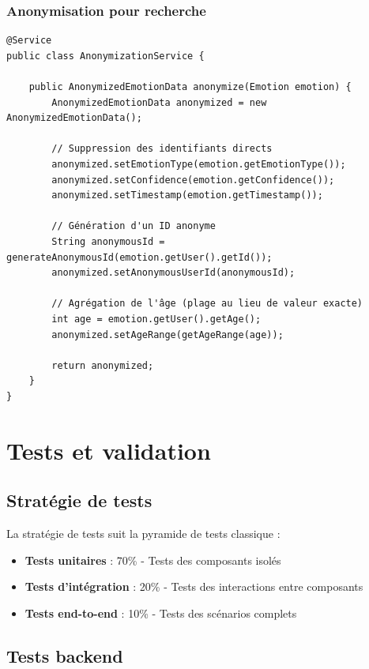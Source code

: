 \documentclass[a4paper,11pt]{report}
\begin{document}
\subsection{Anonymisation pour recherche}

\begin{lstlisting}[style=java, caption=Service d'anonymisation des données]
@Service
public class AnonymizationService {
    
    public AnonymizedEmotionData anonymize(Emotion emotion) {
        AnonymizedEmotionData anonymized = new AnonymizedEmotionData();
        
        // Suppression des identifiants directs
        anonymized.setEmotionType(emotion.getEmotionType());
        anonymized.setConfidence(emotion.getConfidence());
        anonymized.setTimestamp(emotion.getTimestamp());
        
        // Génération d'un ID anonyme
        String anonymousId = generateAnonymousId(emotion.getUser().getId());
        anonymized.setAnonymousUserId(anonymousId);
        
        // Agrégation de l'âge (plage au lieu de valeur exacte)
        int age = emotion.getUser().getAge();
        anonymized.setAgeRange(getAgeRange(age));
        
        return anonymized;
    }
}
\end{lstlisting}

\chapter{Tests et validation}

\section{Stratégie de tests}

La stratégie de tests suit la pyramide de tests classique :

\begin{itemize}
    \item \textbf{Tests unitaires} : 70\% - Tests des composants isolés
    \item \textbf{Tests d'intégration} : 20\% - Tests des interactions entre composants
    \item \textbf{Tests end-to-end} : 10\% - Tests des scénarios complets
\end{itemize}

\section{Tests backend}
\end{document}
